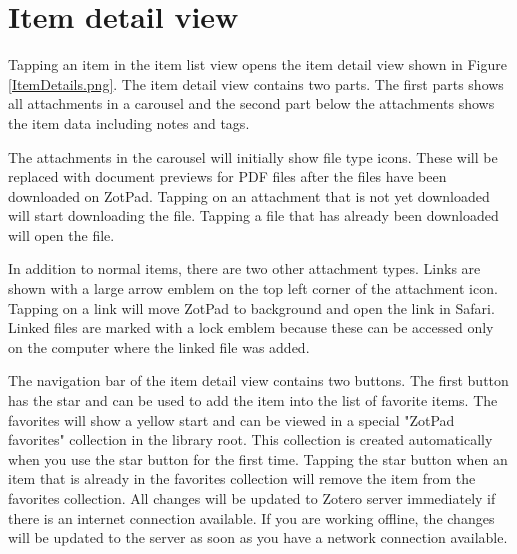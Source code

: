 \documentclass[oneside, openany, 12pt]{tufte-book}
\newcommand{\ipad}[1]{}
\newcommand{\image}[2]{
	\center
	\fbox{\texttt{[image: images/iPhone/\{\#2]}}}

	\caption{#1 \label{#2}}
	\smallskip\noindent\small Figure \ref{#2}: #1
	}
\newcommand{\ipadfootnote}[1]{}
\newcommand{\ipad}[1]{#1}
\newcommand{\image}[2]{
	\caption{#1}
	\label{#2}
	\fbox{\texttt{[image: images/iPad/\{\#2]}}}
	}
\newcommand{\ipadfootnote}[1]{\footnote{#1}}
\begin{document}
\clearpage

\section{Item detail view}

Tapping an item in the item list view opens the item detail view shown in Figure \ref{ItemDetails.png}. \ipad{Opening the item detail view will push the item list into the navigator to allow quickly switching between items.

}The item detail view contains two parts. The first parts shows all attachments in a carousel and the second part below the attachments shows the item data including notes and tags.

The attachments in the carousel will initially show file type icons. These will be replaced with document previews for PDF files after the files have been downloaded on ZotPad. Tapping on an attachment\ipadfootnote{Both imported items and web site snapshots are normal items that can be downloaded and viewed on ZotPad.} that is not yet downloaded will start downloading the file. Tapping a file that has already been downloaded will open the file.

\begin{figure}
\image{Top part of item detail view}{ItemDetails.png}
\end{figure}

In addition to normal items, there are two other attachment types. Links are shown with a large arrow emblem on the top left corner of the attachment icon. Tapping on a link will move ZotPad to background and open the link in Safari. Linked files are marked with a lock emblem because these can be accessed only on the computer where the linked file was added\ipadfootnote{Linked files can be accessed if they are stored in Dropbox and this experimental feature is enabled in the advanced Dropbox settings.}.

The navigation bar of the item detail view contains two buttons. The first button has the star and can be used to add the item into the list of favorite items. The favorites will show a yellow start and can be viewed in a special "ZotPad favorites" collection in the library root. This collection is created automatically when you use the star button for the first time. Tapping the star button when an item that is already in the favorites collection will remove the item from the favorites collection. All changes will be updated to Zotero server immediately if there is an internet connection available. If you are working offline, the changes will be updated to the server as soon as you have a network connection available.
\end{document}
